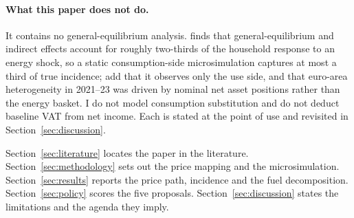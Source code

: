 \paragraph{What this paper does not do.} It contains no general-equilibrium analysis. \citet{kanzig2023} finds that general-equilibrium and indirect effects account for roughly two-thirds of the household response to an energy shock, so a static consumption-side microsimulation captures at most a third of true incidence; \citet{goulder2019} add that it observes only the use side, and \citet{pallotti2024} that euro-area heterogeneity in 2021--23 was driven by nominal net asset positions rather than the energy basket. I do not model consumption substitution and do not deduct baseline VAT from net income. Each is stated at the point of use and revisited in Section~\ref{sec:discussion}.

Section~\ref{sec:literature} locates the paper in the literature. Section~\ref{sec:methodology} sets out the price mapping and the microsimulation. Section~\ref{sec:results} reports the price path, incidence and the fuel decomposition. Section~\ref{sec:policy} scores the five proposals. Section~\ref{sec:discussion} states the limitations and the agenda they imply.

